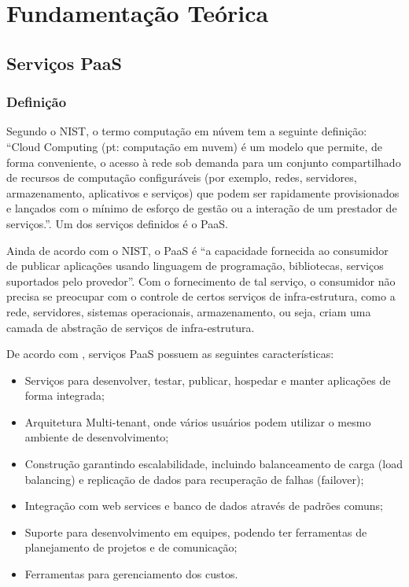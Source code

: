 \chapter{Fundamentação Teórica} \label{CHP:FUND}

\section{Serviços PaaS}
\subsection{Definição}

Segundo o \ac{NIST}, o termo computação em núvem tem a seguinte definição: ``Cloud Computing (pt: computação em nuvem) é um modelo que permite, de forma conveniente, o acesso à rede sob demanda para um conjunto compartilhado de recursos de computação configuráveis (por exemplo, redes, servidores, armazenamento, aplicativos e serviços) que podem ser rapidamente provisionados e lançados  com o mínimo de esforço de gestão ou a interação de um prestador de serviços.''. Um dos serviços definidos é o \ac{PaaS}.

	Ainda de acordo com o \ac{NIST}, o \ac{PaaS} é ``a capacidade fornecida ao consumidor de publicar aplicações usando linguagem de programação, bibliotecas, serviços suportados pelo provedor''. Com o fornecimento de tal serviço, o consumidor não precisa se preocupar com o controle de certos serviços de infra-estrutura, como a rede, servidores, sistemas operacionais, armazenamento, ou seja, criam uma camada de abstração de serviços de infra-estrutura.
	
	De acordo com \cite{cloudstack}, serviços \ac{PaaS} possuem as seguintes características:
\begin{itemize}
\item Serviços para desenvolver, testar, publicar, hospedar e manter aplicações de forma integrada;
\item Arquitetura Multi-tenant, onde vários usuários podem utilizar o mesmo ambiente de desenvolvimento;
\item Construção garantindo escalabilidade, incluindo balanceamento de carga (load balancing) e replicação de dados para recuperação de falhas (failover);
\item Integração com web services e banco de dados através de padrões comuns;
\item Suporte para desenvolvimento em equipes, podendo ter ferramentas de planejamento de projetos e de comunicação;
\item Ferramentas para gerenciamento dos custos.
\end{itemize}

